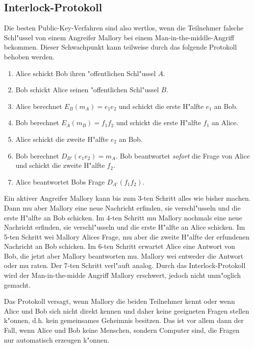 \subsection{Interlock-Protokoll}
Die besten Public-Key-Verfahren sind also wertlos, wenn die Teilnehmer
falsche Schl"ussel von einem Angreifer Mallory bei einem
Man-in-the-middle-Angriff bekommen. Dieser Schwachpunkt kann
teilweise durch das folgende Protokoll behoben werden.
\begin{enumerate}
  \item Alice schickt Bob ihren "offentlichen Schl"ussel $A$.
  \item Bob schickt Alice seinen "offentlichen Schl"ussel $B$.
  \item Alice berechnet $E_B(m_A)=e_1 e_2$ und schickt die erste
        H"alfte $e_1$ an Bob.
  \item Bob berechnet $E_A(m_B)=f_1 f_2$ und schickt die erste H"alfte
        $f_1$ an Alice.
  \item Alice schickt die zweite H"alfte $e_2$ an Bob.
  \item Bob berechnet $D_{B'}(e_1 e_2)=m_A$. Bob beantwortet {\em sofort}
        die Frage von Alice und schickt die zweite H"alfte $f_2$.
  \item Alice beantwortet Bobs Frage $D_{A'}(f_1 f_2)$.
\end{enumerate}
Ein aktiver Angreifer Mallory kann bis zum 3-ten Schritt alles wie
bisher machen. Dann mu\3 aber Mallory eine neue Nachricht erfinden,
sie verschl"usseln und die erste H"alfte an Bob schicken. Im 4-ten
Schritt mu\3 Mallory nochmals eine neue Nachricht erfinden, sie
verschl"usseln und die erste H"alfte an Alice schicken.  Im 5-ten
Schritt wei\3 Mallory Alices Frage, mu\3 aber die zweite H"alfte der
erfundenen Nachricht an Bob schicken. Im 6-ten Schritt erwartet Alice
eine Antwort von Bob, die jetzt aber Mallory beantworten
mu\3. Mallory wei\3 entweder die Antwort oder mu\3 raten. Der 7-ten
Schritt verl"auft analog. Durch das Interlock-Protokoll wird der
Man-in-the-midde Angriff Mallory erschwert, jedoch nicht unm"oglich
gemacht.

Das Protokoll versagt, wenn  Mallory die beiden Teilnehmer kennt oder wenn
Alice und Bob sich nicht direkt kennen und daher keine geeigneten Fragen
stellen k"onnen, d.h. kein gemeinsames Geheimnis besitzen. Das ist vor
allem dann der Fall, wenn Alice und Bob keine Menschen, sondern
Computer sind, die Fragen nur automatisch erzeugen k"onnen.

